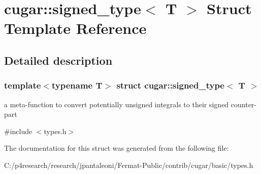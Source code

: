 \hypertarget{structcugar_1_1signed__type}{}\section{cugar\+:\+:signed\+\_\+type$<$ T $>$ Struct Template Reference}
\label{structcugar_1_1signed__type}


\subsection{Detailed description}
\subsubsection*{template$<$typename T$>$\newline
struct cugar\+::signed\+\_\+type$<$ T $>$}

a meta-\/function to convert potentially unsigned integrals to their signed counter-\/part 

{\ttfamily \#include $<$types.\+h$>$}



The documentation for this struct was generated from the following file\+:\begin{DoxyCompactItemize}
\item 
C\+:/p4research/research/jpantaleoni/\+Fermat-\/\+Public/contrib/cugar/basic/types.\+h\end{DoxyCompactItemize}
